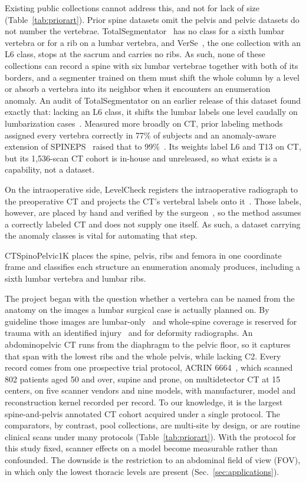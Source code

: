 \documentclass[aapm,mph,amsmath,amssymb,reprint]{revtex4-2}
\begin{document}
Existing public collections cannot address this, and not for lack of size
(Table~\ref{tab:priorart}). Prior spine datasets omit the pelvis and pelvic datasets do not number
the vertebrae. TotalSegmentator~\cite{totalsegmentator} has no class for a sixth lumbar vertebra or for a rib on a
lumbar vertebra, and VerSe~\cite{verse2021}, the one collection with an L6 class, stops at the sacrum and
carries no ribs. As such, none of these collections can record a spine with six lumbar vertebrae together with both of its
borders, and a segmenter trained on them must shift the
whole column by a level or absorb a vertebra into its neighbor when it encounters an enumeration anomaly. An audit of TotalSegmentator on an earlier release of this dataset found exactly that: lacking an L6 class, it shifts the lumbar labels one level caudally on lumbarization cases~\cite{neurips2026lstv}. Measured more broadly
on CT, prior labeling methods assigned every vertebra correctly in 77\% of subjects and
an anomaly-aware extension of SPINEPS~\cite{spineps2025} raised that to
99\%~\cite{veridah2026}. Its weights label L6 and T13 on CT, but its 1{,}536-scan CT cohort is in-house and
unreleased, so what exists is a capability, not a dataset. 

On the intraoperative side, LevelCheck registers the intraoperative
radiograph to the preoperative CT and projects the CT's vertebral labels onto
it~\cite{otake2012,lo2015,desilva2016}. Those labels, however, are placed by hand and verified by
the surgeon~\cite{otake2012}, so the method assumes a correctly labeled CT and does not supply
one itself. As such, a dataset carrying the anomaly classes is vital for automating that step.

CTSpinoPelvic1K places the spine, pelvis, ribs and femora in one coordinate frame and classifies each structure an enumeration anomaly produces, including a sixth lumbar vertebra and lumbar ribs.

The project began with the question whether a vertebra can be named from the anatomy on the images a lumbar surgical case is actually planned on. By guideline those images are lumbar-only~\cite{acr2021,nass2013,acrct2022,acrmri2023} and whole-spine coverage is reserved for trauma with an identified
injury~\cite{sixta2012,tqip2018} and for deformity
radiographs. An abdominopelvic CT runs from the diaphragm to the pelvic floor, so it captures
that span with the lowest ribs and the whole pelvis, while lacking C2. Every record
comes from one prospective trial protocol, ACRIN 6664~\cite{colonog,tcia}, which scanned 802 patients aged 50 and over, supine and prone, on multidetector CT at 15 centers, on five scanner
vendors and nine models, with manufacturer, model and reconstruction kernel recorded per
record. To our knowledge, it is the largest spine-and-pelvis annotated CT cohort acquired under a
single protocol. The comparators, by contrast, pool collections, are multi-site by design, or are
routine clinical scans under many protocols (Table~\ref{tab:priorart}). With the protocol for this study fixed, scanner effects on a model become measurable rather than confounded. The downside is the restriction to an abdominal field of view (FOV), in which only the lowest thoracic levels are present
(Sec.~\ref{sec:applications}).
\end{document}
